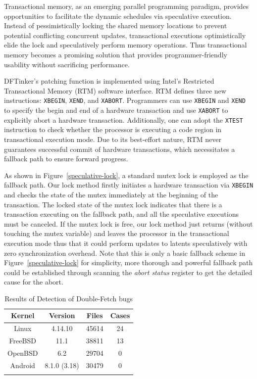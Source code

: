 \documentclass[10pt]{llncs}
\begin{document}
Transactional memory, as an emerging parallel programming paradigm, provides opportunities to facilitate the dynamic schedules via speculative execution. Instead of pessimistically locking the shared memory locations to prevent potential conflicting concurrent updates, transactional executions optimistically elide the lock and speculatively perform memory operations. Thus transactional memory becomes a promising solution that provides programmer-friendly usability without sacrificing performance.

DFTinker's patching function is implemented using Intel's Restricted Transactional Memory (RTM) software interface. RTM defines three new instructions: \verb:XBEGIN:, \verb:XEND:, and \verb:XABORT:. Programmers can use \verb:XBEGIN: and \verb:XEND: to specify the begin and end of a hardware transaction and use \verb:XABORT: to explicitly abort a hardware transaction. Additionally, one can adopt the \verb:XTEST: instruction to check whether the processor is executing a code region in transactional execution mode. Due to its best-effort nature, RTM never guarantees successful commit of hardware transactions, which necessitates a fallback path to ensure forward progress.




As shown in Figure~\ref{speculative-lock}, a standard mutex lock is employed as the fallback path. 
Our lock method firstly initiates a hardware transaction via \verb:XBEGIN: and checks the state of the mutex immediately at the beginning of the transaction. The locked state of the mutex lock indicates that there is a transaction executing on the fallback path, and all the speculative executions must be canceled. 
If the mutex lock is free, our lock method just returns (without touching the mutex variable) and leaves the processor in the transactional execution mode thus that it could perform updates to latents speculatively with zero synchronization overhead. 
Note that this is only a basic fallback scheme in Figure~\ref{speculative-lock} for simplicity, 
more thorough and powerful fallback path could be established through scanning the \textit{abort status} register to get the detailed cause for the abort. 

\begin{table}[t]
  \centering
  \caption{Results of Detection of Double-Fetch bugs}
  \begin{tabular}{cccc}
    \hline
    Kernel & Version & Files & Cases \\   
    \hline
    Linux & 4.14.10 & 45614 & 24 \\
    FreeBSD & 11.1 & 38811 & 13 \\
    OpenBSD & 6.2 & 29704 & 0 \\
    Android & 8.1.0 (3.18) & 30479 & 0 \\
    \hline
    \label{stat}
  \end{tabular}
\end{table}
\end{document}
